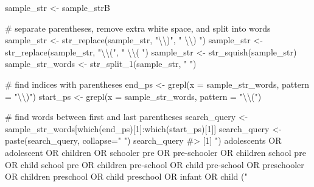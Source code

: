 \documentclass[
  letterpaper,
]{latex/krantz}
\makeatletter
\newenvironment{Shaded}{\begin{snugshade}}{\end{snugshade}}
\newcommand{\AttributeTok}[1]{\textcolor[rgb]{0.40,0.45,0.13}{#1}}
\newcommand{\CommentTok}[1]{\textcolor[rgb]{0.37,0.37,0.37}{#1}}
\newcommand{\DecValTok}[1]{\textcolor[rgb]{0.68,0.00,0.00}{#1}}
\newcommand{\FunctionTok}[1]{\textcolor[rgb]{0.28,0.35,0.67}{#1}}
\newcommand{\NormalTok}[1]{\textcolor[rgb]{0.00,0.23,0.31}{#1}}
\newcommand{\OtherTok}[1]{\textcolor[rgb]{0.00,0.23,0.31}{#1}}
\newcommand{\SpecialCharTok}[1]{\textcolor[rgb]{0.37,0.37,0.37}{#1}}
\newcommand{\StringTok}[1]{\textcolor[rgb]{0.13,0.47,0.30}{#1}}
\newenvironment{kframe}{%
\medskip{}
\setlength{\fboxsep}{.8em}
 \def\at@end@of@kframe{}%
 \ifinner\ifhmode%
  \def\at@end@of@kframe{\end{minipage}}%
  \begin{minipage}{\columnwidth}%
 \fi\fi%
 \def\FrameCommand##1{\hskip\@totalleftmargin \hskip-\fboxsep
 \colorbox{shadecolor}{##1}\hskip-\fboxsep
     \hskip-\linewidth \hskip-\@totalleftmargin \hskip\columnwidth}%
 \MakeFramed {\advance\hsize-\width
   \@totalleftmargin\z@ \linewidth\hsize
   \@setminipage}}%
 {\par\unskip\endMakeFramed%
 \at@end@of@kframe}
\renewenvironment{Shaded}{\begin{kframe}}{\end{kframe}}
\makeatother
\begin{document}
\begin{Shaded}
\begin{Highlighting}[]
\NormalTok{sample\_str }\OtherTok{\textless{}{-}}\NormalTok{ sample\_strB}

\CommentTok{\# separate parentheses, remove extra white space, and split into words}
\NormalTok{sample\_str }\OtherTok{\textless{}{-}} \FunctionTok{str\_replace}\NormalTok{(sample\_str, }\StringTok{"}\SpecialCharTok{\textbackslash{}\textbackslash{}}\StringTok{)"}\NormalTok{, }\StringTok{" }\SpecialCharTok{\textbackslash{}\textbackslash{}}\StringTok{) "}\NormalTok{)}
\NormalTok{sample\_str }\OtherTok{\textless{}{-}} \FunctionTok{str\_replace}\NormalTok{(sample\_str, }\StringTok{"}\SpecialCharTok{\textbackslash{}\textbackslash{}}\StringTok{("}\NormalTok{, }\StringTok{" }\SpecialCharTok{\textbackslash{}\textbackslash{}}\StringTok{( "}\NormalTok{)}
\NormalTok{sample\_str }\OtherTok{\textless{}{-}} \FunctionTok{str\_squish}\NormalTok{(sample\_str)}
\NormalTok{sample\_str\_words }\OtherTok{\textless{}{-}} \FunctionTok{str\_split\_1}\NormalTok{(sample\_str, }\StringTok{" "}\NormalTok{)}

\CommentTok{\# find indices with parentheses }
\NormalTok{end\_ps }\OtherTok{\textless{}{-}} \FunctionTok{grepl}\NormalTok{(}\AttributeTok{x =}\NormalTok{ sample\_str\_words, }\AttributeTok{pattern =} \StringTok{"}\SpecialCharTok{\textbackslash{}\textbackslash{}}\StringTok{)"}\NormalTok{)}
\NormalTok{start\_ps }\OtherTok{\textless{}{-}} \FunctionTok{grepl}\NormalTok{(}\AttributeTok{x =}\NormalTok{ sample\_str\_words, }\AttributeTok{pattern =} \StringTok{"}\SpecialCharTok{\textbackslash{}\textbackslash{}}\StringTok{("}\NormalTok{)}

\CommentTok{\# find words between first and last parentheses }
\NormalTok{search\_query }\OtherTok{\textless{}{-}}\NormalTok{ sample\_str\_words[}\FunctionTok{which}\NormalTok{(end\_ps)[}\DecValTok{1}\NormalTok{]}\SpecialCharTok{:}\FunctionTok{which}\NormalTok{(start\_ps)[}\DecValTok{1}\NormalTok{]]}
\NormalTok{search\_query }\OtherTok{\textless{}{-}} \FunctionTok{paste}\NormalTok{(search\_query, }\AttributeTok{collapse=}\StringTok{" "}\NormalTok{)}
\NormalTok{search\_query}
\CommentTok{\#\textgreater{} [1] ") adolescents OR adolescent OR children OR schooler pre OR pre{-}schooler OR children school pre OR child school pre OR children pre{-}school OR child pre{-}school OR preschooler OR children preschool OR child preschool OR infant OR child ("}


\end{Highlighting}
\end{Shaded}
\end{document}
